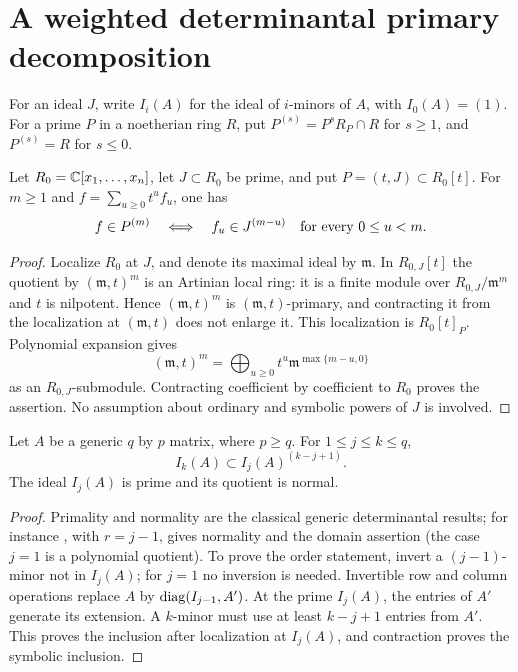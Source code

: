 \section{A weighted determinantal primary decomposition}
\label{sec:weighted-flags}
For an ideal $J$, write $I_i(A)$ for the ideal of $i$-minors of $A$,
with $I_0(A)=(1)$. For a prime $P$ in a noetherian ring $R$, put
$P^{(s)}=P^sR_P\cap R$ for $s\ge1$, and $P^{(s)}=R$ for $s\le0$.

\begin{lemma}
\label{lem:coefficient-symbolic}
Let $R_0=\mathbb C[x_1,\ldots,x_n]$, let $J\subset R_0$ be prime, and
put $P=(t,J)\subset R_0[t]$. For $m\ge1$ and
$f=\sum_{u\ge0}t^u f_u$, one has
\[
 f\in P^{(m)}\quad\Longleftrightarrow\quad
 f_u\in J^{(m-u)}\quad\hbox{for every }0\le u<m.
\]
\end{lemma}
\begin{proof}
Localize $R_0$ at $J$, and denote its maximal ideal by $\mathfrak m$.
In $R_{0,J}[t]$ the quotient by $(\mathfrak m,t)^m$ is an Artinian
local ring: it is a finite module over $R_{0,J}/\mathfrak m^m$
and $t$ is nilpotent. Hence $(\mathfrak m,t)^m$ is
$(\mathfrak m,t)$-primary, and contracting it from the localization
at $(\mathfrak m,t)$ does not enlarge it. This localization is
$R_0[t]_P$. Polynomial expansion gives
\[
 (\mathfrak m,t)^m
   =\bigoplus_{u\ge0}t^u\mathfrak m^{\max\{m-u,0\}}
\]
as an $R_{0,J}$-submodule. Contracting coefficient by coefficient to
$R_0$ proves the assertion. No assumption about ordinary and symbolic
powers of $J$ is involved.
\end{proof}

\begin{lemma}
\label{lem:minor-symbolic-order}
Let $A$ be a generic $q$ by $p$ matrix, where $p\ge q$.
For $1\le j\le k\le q$,
\[
 I_k(A)\subset I_j(A)^{(k-j+1)}.
\]
The ideal $I_j(A)$ is prime and its quotient is normal.
\end{lemma}
\begin{proof}
Primality and normality are the classical generic determinantal
results; for instance \cite[Theorem 3.5(c)]{BRW05}, with
$r=j-1$, gives normality and the domain assertion (the case $j=1$
is a polynomial quotient). To prove the order statement, invert a
$(j-1)$-minor not in $I_j(A)$; for $j=1$ no inversion is needed.
Invertible row and column operations replace $A$ by
$\operatorname{diag}(I_{j-1},A')$. At the prime $I_j(A)$, the entries of $A'$
generate its extension. A $k$-minor must use at least $k-j+1$
entries from $A'$. This proves the inclusion after localization
at $I_j(A)$, and contraction proves the symbolic inclusion.
\end{proof}

